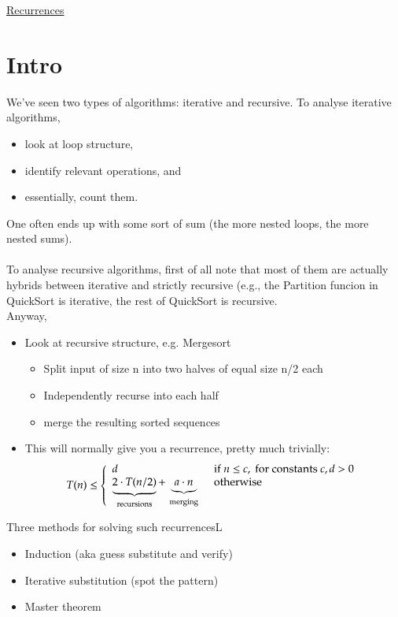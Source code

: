 \documentclass{article}[18pt]
\begin{document}
\begin{center}
\underline{\huge Recurrences}
\end{center}
\section{Intro}
We've seen two types of algorithms: iterative and recursive.
To analyse iterative algorithms,
\begin{itemize}
\item look at loop structure,
\item identify relevant operations, and
\item essentially, count them.
\end{itemize}
One often ends up with some sort of sum (the more nested
loops, the more nested sums).\\
\\
To analyse recursive algorithms, first of all note that most of them
are actually hybrids between iterative and strictly recursive (e.g., the
Partition funcion in QuickSort is iterative, the rest of QuickSort is
recursive.\\
Anyway,
\begin{itemize}
	\item Look at recursive structure, e.g. Mergesort
	\begin{itemize}
		\item Split input of size n into two halves of equal size n/2 each
		\item Independently recurse into each half
		\item merge the resulting sorted sequences
	\end{itemize}
	\item This will normally give you a recurrence, pretty much trivially:
	$$T ( n ) \leq \left\{ \begin{array} { l l } { d } & { \text { if } n \leq c , \text { for constants } c , d > 0 } \\ { \underbrace { 2 \cdot T ( n / 2 ) } _ { \text { recursions } } + \underbrace { a \cdot n } _ { \text { merging } } } & { \text { otherwise } } \end{array} \right.$$
\end{itemize}
Three methods for solving such recurrencesL
\begin{itemize}
	\item Induction (aka guess substitute and verify)
	\item Iterative substitution (spot the pattern)
	\item Master theorem
\end{itemize}
\end{document}
